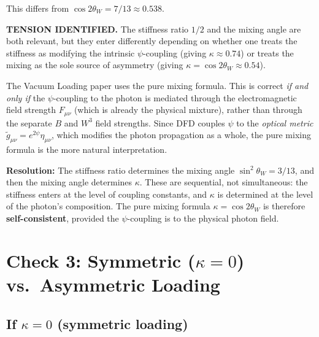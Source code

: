 \documentclass[aps,prd,twocolumn,superscriptaddress,nofootinbib]{revtex4-2}
\begin{document}
This differs from $\cos 2\theta_W = 7/13 \approx 0.538$.

\begin{tcolorbox}[colback=yellow!5!white, colframe=yellow!60!black, title=Verdict: Check 2]
\textbf{TENSION IDENTIFIED.}  The stiffness ratio $1/2$ and the
mixing angle are both relevant, but they enter differently depending
on whether one treats the stiffness as modifying the intrinsic
$\psi$-coupling (giving $\kappa \approx 0.74$) or treats the
mixing as the sole source of asymmetry (giving
$\kappa = \cos 2\theta_W \approx 0.54$).

The Vacuum Loading paper uses the pure mixing formula.  This is
correct \emph{if and only if} the $\psi$-coupling to the photon
is mediated through the electromagnetic field strength $F_{\mu\nu}$
(which is already the physical mixture), rather than through the
separate $B$ and $W^3$ field strengths.  Since DFD couples $\psi$
to the \emph{optical metric} $\tilde{g}_{\mu\nu} = e^{2\psi}\eta_{\mu\nu}$,
which modifies the photon propagation as a whole, the pure mixing
formula is the more natural interpretation.

\textbf{Resolution:} The stiffness ratio determines the mixing
angle $\sin^2\theta_W = 3/13$, and then the mixing angle determines
$\kappa$.  These are sequential, not simultaneous: the stiffness
enters at the level of coupling constants, and $\kappa$ is
determined at the level of the photon's composition.  The pure
mixing formula $\kappa = \cos 2\theta_W$ is therefore
\textbf{self-consistent}, provided the $\psi$-coupling is to the
physical photon field.
\end{tcolorbox}


\section{Check 3: Symmetric ($\kappa = 0$) vs.\ Asymmetric Loading}
\label{sec:check3}

\subsection{If $\kappa = 0$ (symmetric loading)}
\end{document}

